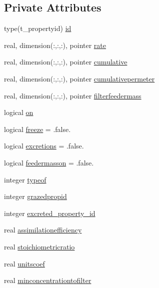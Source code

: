 \subsection*{Private Attributes}
\begin{DoxyCompactItemize}
\item 
type(t\+\_\+propertyid) \mbox{\hyperlink{structmodulewaterproperties_1_1t__filtration_a199b0a2a664b7f6e4d31bfe2c5ee9979}{id}}
\item 
real, dimension(\+:,\+:,\+:), pointer \mbox{\hyperlink{structmodulewaterproperties_1_1t__filtration_afea266084650d36dadc47ed4841bd6d4}{rate}}
\item 
real, dimension(\+:,\+:,\+:), pointer \mbox{\hyperlink{structmodulewaterproperties_1_1t__filtration_a84d32cd0782731228ab7f026c1a5e564}{cumulative}}
\item 
real, dimension(\+:,\+:,\+:), pointer \mbox{\hyperlink{structmodulewaterproperties_1_1t__filtration_ac3da1056785cc06c9fa637818cfdad9f}{cumulativepermeter}}
\item 
real, dimension(\+:,\+:,\+:), pointer \mbox{\hyperlink{structmodulewaterproperties_1_1t__filtration_ac66f0f1c3235b7768fafd734f69180e2}{filterfeedermass}}
\item 
logical \mbox{\hyperlink{structmodulewaterproperties_1_1t__filtration_a1fb405f1403be1bae7771d85f2dfa641}{on}}
\item 
logical \mbox{\hyperlink{structmodulewaterproperties_1_1t__filtration_a09dcc0db52601df8d1133a744e271eb7}{freeze}} = .false.
\item 
logical \mbox{\hyperlink{structmodulewaterproperties_1_1t__filtration_aa9a8c402f35ad18019323c574558f976}{excretions}} = .false.
\item 
logical \mbox{\hyperlink{structmodulewaterproperties_1_1t__filtration_aa596ab00e16db4a4ab29299097769fff}{feedermasson}} = .false.
\item 
integer \mbox{\hyperlink{structmodulewaterproperties_1_1t__filtration_a0bc9f8c3d2485e0b9c6bc1d40197d802}{typeof}}
\item 
integer \mbox{\hyperlink{structmodulewaterproperties_1_1t__filtration_aee11f7e80bc3fbfe1bfc29b7af2dafb4}{grazedpropid}}
\item 
integer \mbox{\hyperlink{structmodulewaterproperties_1_1t__filtration_a4c69cd27edc7ea1e06dceaa72c9e14b2}{excreted\+\_\+property\+\_\+id}}
\item 
real \mbox{\hyperlink{structmodulewaterproperties_1_1t__filtration_abc65b516967185ea5f9be4ef98c4b219}{assimilationefficiency}}
\item 
real \mbox{\hyperlink{structmodulewaterproperties_1_1t__filtration_aee344a70dbef997ba4bddccb7d17059e}{stoichiometricratio}}
\item 
real \mbox{\hyperlink{structmodulewaterproperties_1_1t__filtration_af5209e70037cb54d36d9ca0f57f00aa8}{unitscoef}}
\item 
real \mbox{\hyperlink{structmodulewaterproperties_1_1t__filtration_a4c15844cc033f7bd9ec6753ad55a5f03}{minconcentrationtofilter}}
\end{DoxyCompactItemize}


